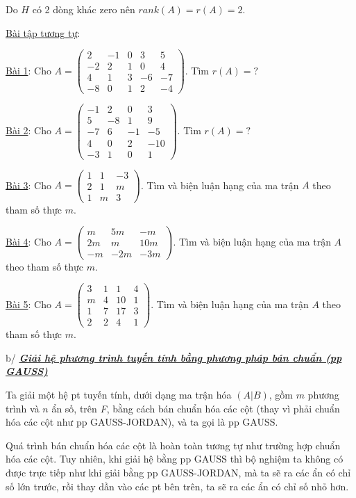 \documentclass[12pt,a4paper]{article} \usepackage[utf8]{inputenc} \usepackage[T5]{fontenc} \usepackage[vietnamese]{babel} \usepackage{amsmath, amssymb, amsfonts} \usepackage{ulem}
\begin{document}
Do $H$ có 2 dòng khác zero nên $rank(A) = r(A) = 2$.

\ul{Bài tập tương tự}:

\ul{Bài 1}: Cho
$A = \begin{pmatrix} 2 & -1 & 0 & 3 & 5 \\ -2 & 2 & 1 & 0 & 4 \\ 4 & 1 & 3 & -6 & -7 \\ -8 & 0 & 1 & 2 & -4 \end{pmatrix}$. Tìm
$r(A) = ?$

\ul{Bài 2}: Cho
$A = \begin{pmatrix} -1 & 2 & 0 & 3 \\ 5 & -8 & 1 & 9 \\ -7 & 6 & -1 & -5 \\ 4 & 0 & 2 & -10 \\ -3 & 1 & 0 & 1 \end{pmatrix}$. Tìm
$r(A) = ?$

\ul{Bài 3}: Cho
$A = \begin{pmatrix} 1 & 1 & -3 \\ 2 & 1 & m \\ 1 & m & 3 \end{pmatrix}$. Tìm và biện
luận hạng của ma trận $A$ theo tham số thực $m$.

\ul{Bài 4}: Cho
$A = \begin{pmatrix} m & 5m & -m \\ 2m & m & 10m \\ -m & -2m & -3m \end{pmatrix}$. Tìm và biện
luận hạng của ma trận $A$ theo tham số thực $m$.

\ul{Bài 5}: Cho
$A = \begin{pmatrix} 3 & 1 & 1 & 4 \\ m & 4 & 10 & 1 \\ 1 & 7 & 17 & 3 \\ 2 & 2 & 4 & 1 \end{pmatrix}$. Tìm và biện
luận hạng của ma trận $A$ theo tham số thực $m$.

b/ \emph{\textbf{\ul{Giải hệ phương trình tuyến tính bằng phương pháp
bán chuẩn (pp GAUSS)}}}

Ta giải một hệ pt tuyến tính, dưới dạng ma trận hóa $(A|B)$, gồm $m$ phương trình và $n$ ẩn số, trên \emph{F}, bằng cách bán chuẩn hóa các cột (thay vì phải chuẩn hóa các cột như pp GAUSS-JORDAN), và ta gọi là pp GAUSS.

Quá trình bán chuẩn hóa các cột là hoàn toàn tương tự như trường hợp chuẩn hóa các cột. Tuy nhiên, khi giải hệ bằng pp GAUSS thì bộ nghiệm ta không có được trực tiếp như khi giải bằng pp GAUSS-JORDAN, mà ta sẽ ra các ẩn có chỉ số lớn trước, rồi thay dần vào các pt bên trên, ta sẽ ra các ẩn có chỉ số nhỏ hơn.
\end{document}
